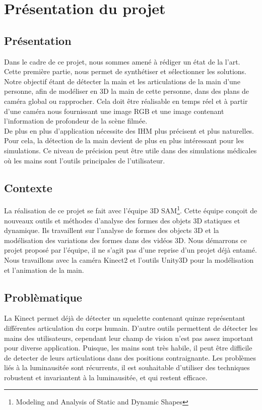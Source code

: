 \chapter{Présentation du projet}

\section{Présentation}
Dans le cadre de ce projet, nous sommes amené à rédiger un état de la l'art.
Cette première partie, nous permet de synthétiser et sélectionner les 
solutions. Notre objectif étant de détecter la main et les articulations 
de la main d'une personne, afin de modéliser en 3D la main de cette personne, 
dans des plans de caméra global ou rapprocher. Cela doit être réalisable en 
temps réel et à partir d'une caméra nous fournissant une image RGB et une 
image contenant l'information de profondeur de la scène filmée.\\

De plus en plus d'application nécessite des IHM plus précisent et plus 
naturelles. Pour cela, la détection de la main devient de plus en plus 
intéressant pour les simulations. Ce niveau de précision peut être
utile dans des simulations médicales où les mains sont l'outils principales 
de l'utilisateur.\\ %

\section{Contexte}
La réalisation de ce projet se fait avec l'équipe 3D SAM\footnote{Modeling 
and Analysis of Static and Dynamic Shapes}. Cette équipe conçoit de 
nouveaux outils et méthodes d'analyse des formes des objets 3D statiques 
et dynamique. Ils travaillent sur l'analyse de formes des objects 3D et la 
modélisation des variations des formes dans des vidéos 3D. Nous démarrons 
ce projet proposé par l'équipe, il ne s'agit pas d'une reprise d'un projet 
déjà entamé. Nous travaillons avec la caméra Kinect2 et l'outils Unity3D 
pour la modélisation et l'animation de la main.

\section{Problèmatique}
La Kinect permet déjà de détecter un squelette contenant quinze représentant 
différentes articulation du corps humain. 
D'autre outils permettent de détecter les mains des utilisateurs, cependant leur
champ de vision n'est pas assez important pour diverse application.
Puisque, 
les mains sont très habile, il peut être difficile de detecter de leurs 
articulations dans des positions contraignante. Les problèmes liés à 
la luminausitée sont récurrents, il est souhaitable d'utiliser des 
techniques robustent et invariantent à la luminausitée, et qui restent 
efficace.

